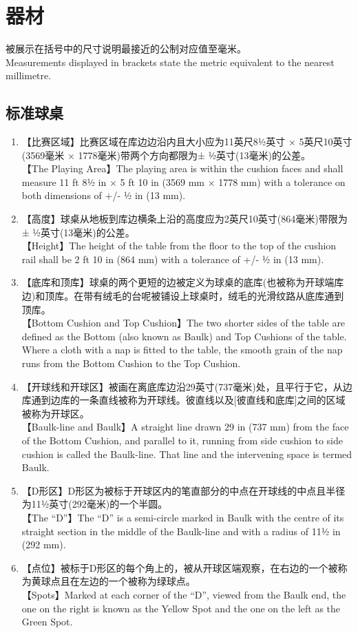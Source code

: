 \section{器材}\label{221}

\noindent 被展示在括号中的尺寸说明最接近的公制对应值至毫米。\\
Measurements displayed in brackets state the metric equivalent to the nearest millimetre.

\subsection{标准球桌}\label{2211}

\begin{enumerate}[label=(\alph*)]
    \item 【比赛区域】比赛区域在库边边沿内且大小应为11英尺8½英寸 × 5英尺10英寸(3569毫米 × 1778毫米)带两个方向都限为± ½英寸(13毫米)的公差。\\
    【The Playing Area】The playing area is within the cushion faces and shall measure 11 ft 8½ in × 5 ft 10 in (3569 mm × 1778 mm) with a tolerance on both dimensions of +/- ½ in (13 mm).
    \item 【高度】球桌从地板到库边横条上沿的高度应为2英尺10英寸(864毫米)带限为± ½英寸(13毫米)的公差。\\
    【Height】The height of the table from the floor to the top of the cushion rail shall be 2 ft 10 in (864 mm) with a tolerance of +/- ½ in (13 mm).
    \item 【底库和顶库】球桌的两个更短的边被定义为球桌的底库(也被称为开球端库边)和顶库。在带有绒毛的台呢被铺设上球桌时，绒毛的光滑纹路从底库通到顶库。\\
    【Bottom Cushion and Top Cushion】The two shorter sides of the table are defined as the Bottom (also known as Baulk) and Top Cushions of the table. Where a cloth with a nap is fitted to the table, the smooth grain of the nap runs from the Bottom Cushion to the Top Cushion.
    \item 【开球线和开球区】被画在离底库边沿29英寸(737毫米)处，且平行于它，从边库通到边库的一条直线被称为开球线。彼直线以及[彼直线和底库]之间的区域被称为开球区。\\
    【Baulk-line and Baulk】A straight line drawn 29 in (737 mm) from the face of the Bottom Cushion, and parallel to it, running from side cushion to side cushion is called the Baulk-line. That line and the intervening space is termed Baulk.
    \item 【D形区】D形区为被标于开球区内的笔直部分的中点在开球线的中点且半径为11½英寸(292毫米)的一个半圆。\\
    【The ``D''】The ``D'' is a semi-circle marked in Baulk with the centre of its straight section in the middle of the Baulk-line and with a 
    radius of 11½ in (292 mm).
    \item \label{2211f}【点位】被标于D形区的每个角上的，被从开球区端观察，在右边的一个被称为黄球点且在左边的一个被称为绿球点。\\
    【Spots】Marked at each corner of the ``D'', viewed from the Baulk end, the one on the right is known as the Yellow Spot and the one on the left as the Green Spot.


\end{enumerate}
